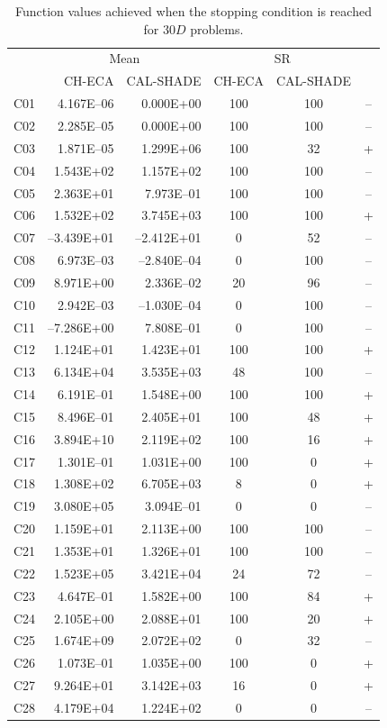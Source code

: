 \documentclass[conference]{IEEEtran}
\begin{document}
% 
% 
% 
\begin{table}[!ht]
	\caption{Function values achieved when the stopping condition is reached for $30D$ problems.}
	\centering
	\begin{tabular}{|c|r|r|c|c|c|}
	 \hline
	 &\multicolumn{2}{|c|}{Mean} & \multicolumn{2}{|c|}{SR} & \\
	\cline{2-5}
	 & CH-ECA & CAL-SHADE & CH-ECA & CAL-SHADE & \\ \hline

  C01 & 4.167E--06  & 0.000E+00  &  100 &  100 & -- \\ 
  C02 & 2.285E--05  & 0.000E+00  &  100 &  100 & -- \\ 
  C03 & 1.871E--05  & 1.299E+06  &  100 &   32 & + \\ 
  C04 & 1.543E+02  & 1.157E+02  &  100 &  100 & -- \\ 
  C05 & 2.363E+01  & 7.973E--01  &  100 &  100 & -- \\ 
  C06 & 1.532E+02  & 3.745E+03  &  100 &  100 & + \\ 
  C07 &--3.439E+01 &--2.412E+01 &    0 &   52 & -- \\ 
  C08 & 6.973E--03  &--2.840E--04 &    0 &  100 & -- \\ 
  C09 & 8.971E+00  & 2.336E--02  &   20 &   96 & -- \\ 
  C10 & 2.942E--03  &--1.030E--04 &    0 &  100 & -- \\ 
  C11 &--7.286E+00 & 7.808E--01  &    0 &  100 & -- \\ 
  C12 & 1.124E+01  & 1.423E+01  &  100 &  100 & + \\ 
  C13 & 6.134E+04  & 3.535E+03  &   48 &  100 & -- \\ 
  C14 & 6.191E--01  & 1.548E+00  &  100 &  100 & + \\ 
  C15 & 8.496E--01  & 2.405E+01  &  100 &   48 & + \\ 
  C16 & 3.894E+10  & 2.119E+02  &  100 &   16 & + \\ 
  C17 & 1.301E--01  & 1.031E+00  &  100 &    0 & + \\ 
  C18 & 1.308E+02  & 6.705E+03  &    8 &    0 & + \\ 
  C19 & 3.080E+05  & 3.094E--01  &    0 &    0 & -- \\ 
  C20 & 1.159E+01  & 2.113E+00  &  100 &  100 & -- \\ 
  C21 & 1.353E+01  & 1.326E+01  &  100 &  100 & -- \\ 
  C22 & 1.523E+05  & 3.421E+04  &   24 &   72 & -- \\ 
  C23 & 4.647E--01  & 1.582E+00  &  100 &   84 & + \\ 
  C24 & 2.105E+00  & 2.088E+01  &  100 &   20 & + \\ 
  C25 & 1.674E+09  & 2.072E+02  &    0 &   32 & -- \\ 
  C26 & 1.073E--01  & 1.035E+00  &  100 &    0 & + \\ 
  C27 & 9.264E+01  & 3.142E+03  &   16 &    0 & + \\ 
  C28 & 4.179E+04  & 1.224E+02  &    0 &    0 & -- \\ 
   \hline
	\end{tabular}
	\label{tab:d30c}
\end{table}
\end{document}
